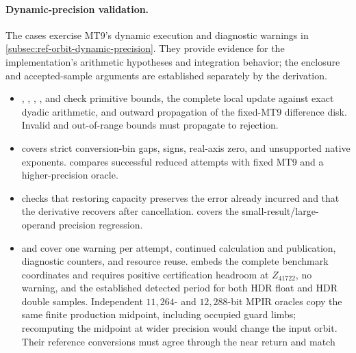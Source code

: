 \paragraph{Dynamic-precision validation.}
The  cases exercise MT9's dynamic execution and diagnostic warnings in
\cref{subsec:ref-orbit-dynamic-precision}. They provide evidence for the
implementation's arithmetic hypotheses and integration behavior; the enclosure
and accepted-sample arguments are established separately by the derivation.
\begin{itemize}
  \item {}, ,
        ,
        , and  check primitive
        bounds, the complete local update against exact dyadic arithmetic, and outward
        propagation of the fixed-MT9 difference disk. Invalid and
        out-of-range bounds must propagate to rejection.
  \item {} covers strict conversion-bin gaps,
        signs, real-axis zero, and unsupported native exponents.
         compares successful reduced attempts
        with fixed MT9 and a higher-precision oracle.
  \item {} checks that restoring
        capacity preserves the error already incurred and that the derivative
        recovers after cancellation.  covers the
        small-result/large-operand precision regression.
  \item {} and
         cover one warning per attempt,
        continued calculation and publication, diagnostic counters, and resource reuse.
         embeds the complete benchmark
        coordinates and requires positive certification headroom at $Z_{41722}$,
        no warning, and the established detected period for both HDR float and
        HDR double samples. Independent $11{,}264$- and $12{,}288$-bit MPIR oracles
        copy the same finite production midpoint, including occupied guard limbs;
        recomputing the midpoint at wider precision would change the input orbit.
        Their reference conversions must agree through the near return and match

\end{itemize}
